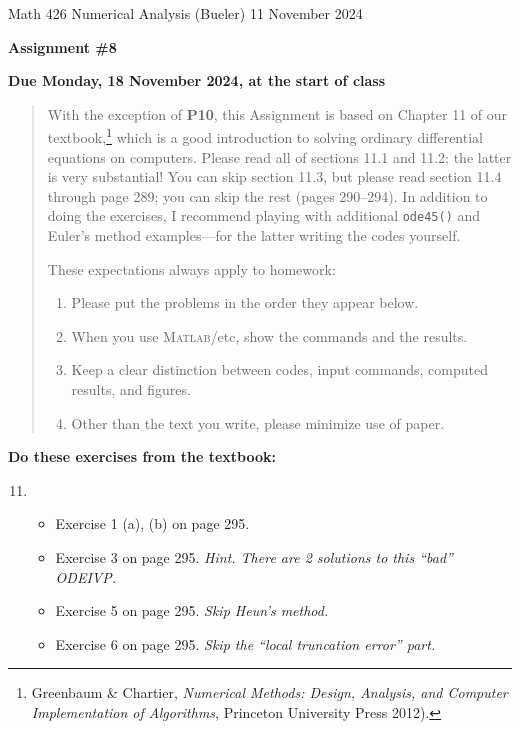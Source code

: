 \documentclass[12pt]{amsart}
\newcommand{\Matlab}{\textsc{Matlab}\xspace}
\begin{document}
\scriptsize \noindent Math 426 Numerical Analysis (Bueler) \hfill 11 November 2024
\normalsize

\medskip\bigskip

\Large\centerline{\textbf{Assignment \#8}}
\large
\bigskip

\centerline{\textbf{Due Monday, 18 November 2024, at the start of class}}
\medskip
\normalsize

\thispagestyle{empty}

\begin{quote}
{\small
With the exception of \textbf{P10}, this Assignment is based on Chapter 11 of our textbook,\footnote{Greenbaum \& Chartier, \emph{Numerical Methods: Design, Analysis, and Computer Implementation of Algorithms}, Princeton University Press 2012).} which is a good introduction to solving ordinary differential equations on computers.  Please read all of sections 11.1 and 11.2; the latter is very substantial!  You can skip section 11.3, but please read section 11.4 through page 289; you can skip the rest (pages 290--294).  In addition to doing the exercises, I recommend playing with additional \texttt{ode45()} and Euler's method examples---for the latter writing the codes yourself.

\medskip
\noindent These expectations always apply to homework:
\renewcommand{\labelenumi}{\arabic{enumi}.\,}
\begin{enumerate}
\item Please put the problems in the order they appear below.
\item When you use \Matlab/etc, show the commands and the results.
\item Keep a clear distinction between codes, input commands, computed results, and figures.
\item Other than the text you write, please minimize use of paper.
\end{enumerate}
}
\end{quote}

\bigskip
\noindent \textbf{Do these exercises from the textbook:}

\smallskip
\renewcommand{\labelenumi}{{\footnotesize\underline{\textsc{Chapter \arabic{enumi}}}}}
\begin{enumerate}
\setcounter{enumi}{10}
\item ~
    \begin{itemize}
    \item Exercise 1 (a), (b) on page 295.
    \item Exercise 3 on page 295. \quad \emph{Hint.  There are 2 solutions to this ``bad'' ODEIVP.}
    \item Exercise 5 on page 295. \quad \emph{Skip Heun's method.}
    \item Exercise 6 on page 295. \quad \emph{Skip the ``local truncation error'' part.}
    \end{itemize}
\end{enumerate}
\end{document}
